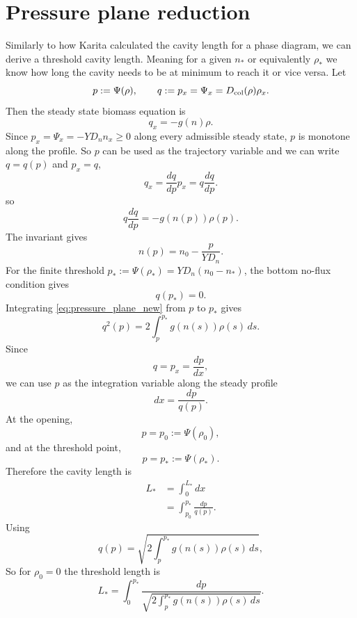 \documentclass[11pt,a4paper]{report}
\begin{document}
\section{Pressure plane reduction}
\label{plane}
Similarly to how Karita \cite{Karita} calculated the cavity length for a phase diagram, we can derive a threshold cavity length. Meaning for a given $n_*$ or equivalently $\rho_*$ we know how long the cavity needs to be at minimum to reach it or vice versa.
Let
\begin{equation}
	p:=\Psi(\rho),
	\qquad
	q:=p_x=\Psi_x=D_{\rm col}(\rho)\rho_x.
\end{equation}
Then the steady state biomass equation is
\begin{equation}
	q_x=-g(n)\rho.
\end{equation}
Since $p_x=\Psi_x=-YD_n n_x\ge 0$ along every admissible steady state,
$p$ is monotone along the profile. So $p$ can be used as the trajectory
variable and we can write $q=q(p)$ and $p_x=q$,
\begin{equation}
	q_x=\frac{dq}{dp}p_x=q\frac{dq}{dp}.
\end{equation}
so
\begin{equation}
	{
		q\frac{dq}{dp}=-g(n(p))\rho(p).
	}
	\label{eq:pressure_plane_new}
\end{equation}
The invariant gives
\begin{equation}
	{
		n(p)=n_0-\frac{p}{YD_n}.
	}
	\label{eq:n_of_p_zero_opening}
\end{equation}
For the finite threshold $p_*:=\Psi(\rho_*)=YD_n(n_0-n_*)$, the bottom
no-flux condition gives
\begin{equation}
	q(p_*)=0.
\end{equation}
Integrating \eqref{eq:pressure_plane_new} from $p$ to $p_*$ gives
\begin{equation}
	{
		q^2(p)=2\int_p^{p_*}g(n(s))\rho(s)\,ds.
	}
\end{equation}
Since
\[
q=p_x=\frac{dp}{dx},
\]
we can use $p$ as the integration variable along the steady profile
\[
dx=\frac{dp}{q(p)}.
\]
At the opening,
\[
p=p_0:=\Psi(\rho_0),
\]
and at the threshold point,
\[
p=p_*:=\Psi(\rho_*).
\]
Therefore the cavity length is
\begin{align}
	L_*
	&=\int_0^{L_*} dx \\
	&=\int_{p_0}^{p_*}\frac{dp}{q(p)}.
	\label{eq:length_from_q}
\end{align}
Using
\[
q(p)
=
\sqrt{
	2\int_p^{p_*}g(n(s))\rho(s)\,ds
},
\]
So for $\rho_0=0$ the threshold length is
\begin{equation}
	{
		L_*=
		\int_0^{p_*}
		\frac{dp}{\sqrt{2\int_p^{p_*}g(n(s))\rho(s)\,ds}}.
	}
	\label{eq:Lstar_exact_new}
\end{equation}
\end{document}
